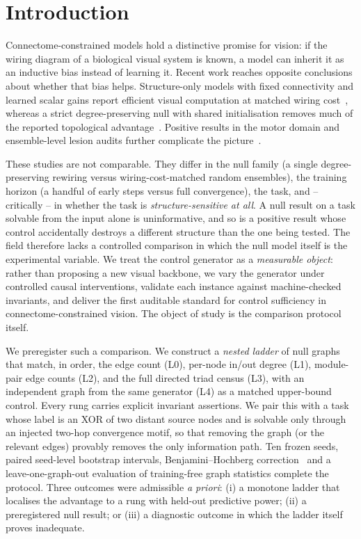 \documentclass[10pt,twocolumn,letterpaper]{article}
\begin{document}






\section{Introduction}
\label{sec:intro}

Connectome-constrained models hold a distinctive promise for vision: if the
wiring diagram of a biological visual system is known, a model can inherit it
as an inductive bias instead of learning it. Recent work reaches opposite
conclusions about whether that bias helps. Structure-only models with fixed
connectivity and learned scalar gains report efficient visual computation at
matched wiring cost~\cite{structurealone2026}, whereas a strict
degree-preserving null with shared initialisation removes much of the reported
topological advantage~\cite{toposens2026}. Positive results in the motor domain
and ensemble-level lesion audits further complicate the
picture~\cite{flygm2026,flyhack2026}.

These studies are not comparable. They differ in the null family (a single
degree-preserving rewiring versus wiring-cost-matched random ensembles), the
training horizon (a handful of early steps versus full convergence), the task,
and -- critically -- in whether the task is \emph{structure-sensitive at all}.
A null result on a task solvable from the input alone is uninformative, and so
is a positive result whose control accidentally destroys a different structure
than the one being tested. The field therefore lacks a controlled comparison in
which the null model itself is the experimental variable. We treat the control
generator as a \emph{measurable object}: rather than proposing a new visual
backbone, we vary the generator under controlled causal interventions,
validate each instance against machine-checked invariants, and deliver the
first auditable standard for control sufficiency in connectome-constrained
vision. The object of study is the comparison protocol itself.

We preregister such a comparison. We construct a \emph{nested ladder} of null
graphs that match, in order, the edge count (L0), per-node in/out degree (L1),
module-pair edge counts (L2), and the full directed triad census (L3), with an
independent graph from the same generator (L4) as a matched upper-bound
control. Every rung carries explicit invariant assertions. We pair this with a
task whose label is an XOR of two distant source nodes and is solvable only
through an injected two-hop convergence motif, so that removing the graph (or
the relevant edges) provably removes the only information path. Ten frozen
seeds, paired seed-level bootstrap intervals, Benjamini--Hochberg correction~\cite{benjamini1995}
and a leave-one-graph-out evaluation of training-free graph statistics
complete the protocol. Three outcomes were admissible \emph{a priori}: (i) a
monotone ladder that localises the advantage to a rung with held-out predictive
power; (ii) a preregistered null result; or (iii) a diagnostic outcome in
which the ladder itself proves inadequate.
\end{document}
